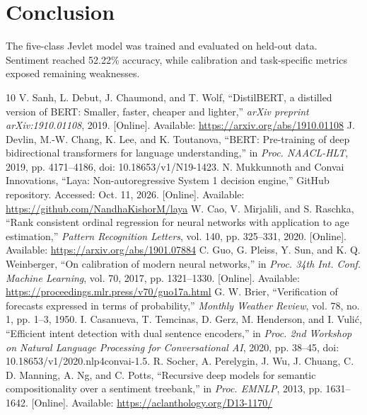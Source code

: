 \documentclass[conference]{IEEEtran}
\begin{document}
\section{Conclusion}
The five-class Jevlet model was trained and evaluated on held-out data. Sentiment reached 52.22\% accuracy, while calibration and task-specific metrics exposed remaining weaknesses.
\begin{thebibliography}{10}
V. Sanh, L. Debut, J. Chaumond, and T. Wolf, ``DistilBERT, a distilled version of BERT: Smaller, faster, cheaper and lighter,'' \emph{arXiv preprint arXiv:1910.01108}, 2019. [Online]. Available: \url{https://arxiv.org/abs/1910.01108}
J. Devlin, M.-W. Chang, K. Lee, and K. Toutanova, ``BERT: Pre-training of deep bidirectional transformers for language understanding,'' in \emph{Proc. NAACL-HLT}, 2019, pp. 4171--4186, doi: 10.18653/v1/N19-1423.
N. Mukkunnoth and Convai Innovations, ``Laya: Non-autoregressive System 1 decision engine,'' GitHub repository. Accessed: Oct. 11, 2026. [Online]. Available: \url{https://github.com/NandhaKishorM/laya}
W. Cao, V. Mirjalili, and S. Raschka, ``Rank consistent ordinal regression for neural networks with application to age estimation,'' \emph{Pattern Recognition Letters}, vol. 140, pp. 325--331, 2020. [Online]. Available: \url{https://arxiv.org/abs/1901.07884}
C. Guo, G. Pleiss, Y. Sun, and K. Q. Weinberger, ``On calibration of modern neural networks,'' in \emph{Proc. 34th Int. Conf. Machine Learning}, vol. 70, 2017, pp. 1321--1330. [Online]. Available: \url{https://proceedings.mlr.press/v70/guo17a.html}
G. W. Brier, ``Verification of forecasts expressed in terms of probability,'' \emph{Monthly Weather Review}, vol. 78, no. 1, pp. 1--3, 1950.
I. Casanueva, T. Temcinas, D. Gerz, M. Henderson, and I. Vuli\'{c}, ``Efficient intent detection with dual sentence encoders,'' in \emph{Proc. 2nd Workshop on Natural Language Processing for Conversational AI}, 2020, pp. 38--45, doi: 10.18653/v1/2020.nlp4convai-1.5.
R. Socher, A. Perelygin, J. Wu, J. Chuang, C. D. Manning, A. Ng, and C. Potts, ``Recursive deep models for semantic compositionality over a sentiment treebank,'' in \emph{Proc. EMNLP}, 2013, pp. 1631--1642. [Online]. Available: \url{https://aclanthology.org/D13-1170/}
\end{thebibliography}
\end{document}
